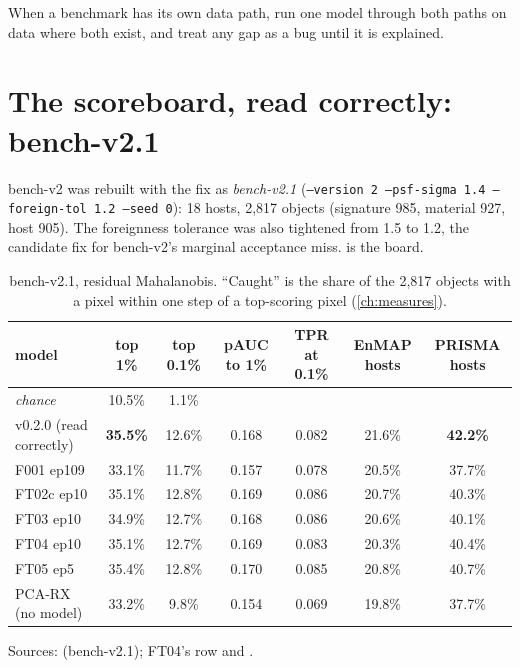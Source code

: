 \begin{keypoint}
When a benchmark has its own data path, run one model through both paths on data where both exist, and treat any
gap as a bug until it is explained.
\end{keypoint}

\section{The scoreboard, read correctly: bench-v2.1}\label{sec:sortbug:board}

bench-v2 was rebuilt with the fix as \emph{bench-v2.1} (\texttt{--version 2 --psf-sigma 1.4 --foreign-tol 1.2
--seed 0}): 18 hosts, 2,817 objects (signature 985, material 927, host
905). The foreignness tolerance was also tightened from 1.5 to
1.2, the candidate fix for bench-v2's marginal acceptance miss.  is the board.

\begin{table}[htbp]
\centering
\caption{bench-v2.1, residual Mahalanobis. ``Caught'' is the share of the 2,817 objects with a pixel within
one step of a top-scoring pixel (\cref{ch:measures}).}
\label{tab:sortbug:v21}
\small\setlength{\tabcolsep}{3.5pt}
\begin{tabular}{lcccccc}
\toprule
model & top 1\% & top 0.1\% & pAUC to 1\% & TPR at 0.1\% & EnMAP hosts & PRISMA hosts \\
\midrule
\textit{chance} & 10.5\% & 1.1\% & & & & \\
v0.2.0 (read correctly) & \textbf{35.5\%} & 12.6\% & 0.168 & 0.082 & 21.6\% & \textbf{42.2\%} \\
F001 ep109 & 33.1\% & 11.7\% & 0.157 & 0.078 & 20.5\% & 37.7\% \\
FT02c ep10 & 35.1\% & 12.8\% & 0.169 & 0.086 & 20.7\% & 40.3\% \\
FT03 ep10 & 34.9\% & 12.7\% & 0.168 & 0.086 & 20.6\% & 40.1\% \\
FT04 ep10 & 35.1\% & 12.7\% & 0.169 & 0.083 & 20.3\% & 40.4\% \\
FT05 ep5 & 35.4\% & 12.8\% & 0.170 & 0.085 & 20.8\% & 40.7\% \\
PCA-RX (no model) & 33.2\% & 9.8\% & 0.154 & 0.069 & 19.8\% & 37.7\% \\
\bottomrule
\end{tabular}

\smallskip
{\footnotesize Sources:  (bench-v2.1); FT04's row
 and .}
\end{table}

